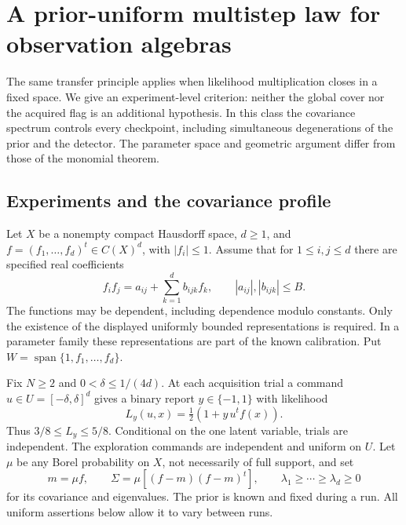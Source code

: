 \documentclass[11pt]{amsart}
\theoremstyle{definition}\newtheorem{definition}[theorem]{Definition}
\theoremstyle{remark}\newtheorem{remark}[theorem]{Remark}
\begin{document}
\section{A prior-uniform multistep law for observation algebras}
\label{sec:algebra-multistep}
The same transfer principle applies when likelihood multiplication closes
in a fixed space. We give an experiment-level criterion: neither the
global cover nor the acquired flag is an additional hypothesis. In this
class the covariance spectrum controls every checkpoint, including
simultaneous degenerations of the prior and the detector. The parameter
space and geometric argument differ from those of the monomial theorem.

\subsection{Experiments and the covariance profile}
Let $X$ be a nonempty compact Hausdorff space, $d\ge1$, and
$f=(f_1,\ldots,f_d)^t\in C(X)^d$, with $|f_i|\le1$.
Assume that for $1\le i,j\le d$ there are specified real coefficients
\begin{equation}\label{eq:algebra-multiplication}
 f_if_j=a_{ij}+\sum_{k=1}^d b_{ijk}f_k,
 \qquad |a_{ij}|,|b_{ijk}|\le B.
\end{equation}
The functions may be dependent, including dependence modulo constants.
Only the existence of the displayed uniformly bounded representations is
required. In a parameter family these representations are part of the
known calibration. Put $W=\operatorname{span}\{1,f_1,\ldots,f_d\}$.

Fix $N\ge2$ and $0<\delta\le1/(4d)$. At each acquisition trial a
command $u\in U=[-\delta,\delta]^d$ gives a binary report $y\in\{-1,1\}$
with likelihood
\begin{equation}\label{eq:algebra-likelihood}
 L_y(u,x)=\tfrac12(1+y\,u^tf(x)).
\end{equation}
Thus $3/8\le L_y\le5/8$. Conditional on the one latent variable,
trials are independent. The exploration commands are independent and
uniform on $U$. Let $\mu$ be any Borel probability on $X$, not necessarily
of full support, and set
\begin{equation}\label{eq:algebra-covariance}
 m=\mu f,\qquad \Sigma=\mu[(f-m)(f-m)^t],\qquad
 \lambda_1\ge\cdots\ge\lambda_d\ge0
\end{equation}
for its covariance and eigenvalues. The prior is known and fixed during
a run. All uniform assertions below allow it to vary between runs.
\end{document}
